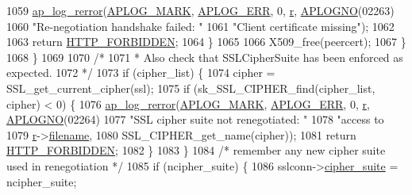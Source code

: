 \begin{DoxyCode}
{{{1059                     \hyperlink{group__APACHE__CORE__LOG_ga4c112558ccffd6b363da102b2052d2a6}{ap\_log\_rerror}(\hyperlink{group__APACHE__CORE__LOG_ga655e126996849bcb82e4e5a14c616f4a}{APLOG\_MARK}, \hyperlink{group__APACHE__CORE__LOG_ga57ad94ed8c92c4306de90479251a5d58}{APLOG\_ERR}, 0, 
      \hyperlink{group__APACHE__CORE__CONFIG_ga091cdd45984e865a888a4f8bb8fe107a}{r}, \hyperlink{group__APACHE__CORE__LOG_ga1dee8a07e06bc5b3de8b89662c2cd666}{APLOGNO}(02263)
1060                                   \textcolor{stringliteral}{"Re-negotiation handshake failed: "}
1061                                   \textcolor{stringliteral}{"Client certificate missing"});
1062 
1063                     \textcolor{keywordflow}{return} \hyperlink{group__HTTP__Status_ga92646f876056a1e5013e0050496dc04d}{HTTP\_FORBIDDEN};
1064                 \}
1065 
1066                 X509\_free(peercert);
1067             \}
1068         \}
1069 
1070         \textcolor{comment}{/*}
1071 \textcolor{comment}{         * Also check that SSLCipherSuite has been enforced as expected.}
1072 \textcolor{comment}{         */}
1073         \textcolor{keywordflow}{if} (cipher\_list) \{
1074             cipher = SSL\_get\_current\_cipher(ssl);
1075             \textcolor{keywordflow}{if} (sk\_SSL\_CIPHER\_find(cipher\_list, cipher) < 0) \{
1076                 \hyperlink{group__APACHE__CORE__LOG_ga4c112558ccffd6b363da102b2052d2a6}{ap\_log\_rerror}(\hyperlink{group__APACHE__CORE__LOG_ga655e126996849bcb82e4e5a14c616f4a}{APLOG\_MARK}, \hyperlink{group__APACHE__CORE__LOG_ga57ad94ed8c92c4306de90479251a5d58}{APLOG\_ERR}, 0, 
      \hyperlink{group__APACHE__CORE__CONFIG_ga091cdd45984e865a888a4f8bb8fe107a}{r}, \hyperlink{group__APACHE__CORE__LOG_ga1dee8a07e06bc5b3de8b89662c2cd666}{APLOGNO}(02264)
1077                              \textcolor{stringliteral}{"SSL cipher suite not renegotiated: "}
1078                              \textcolor{stringliteral}{"access to %
1079                               \hyperlink{group__APACHE__CORE__CONFIG_ga091cdd45984e865a888a4f8bb8fe107a}{r}->\hyperlink{structrequest__rec_a655cb2b33cbb40bd95c8da4d0da55eab}{filename},
1080                               SSL\_CIPHER\_get\_name(cipher));
1081                 \textcolor{keywordflow}{return} \hyperlink{group__HTTP__Status_ga92646f876056a1e5013e0050496dc04d}{HTTP\_FORBIDDEN};
1082             \}
1083         \}
1084         \textcolor{comment}{/* remember any new cipher suite used in renegotiation */}
1085         \textcolor{keywordflow}{if} (ncipher\_suite) \{
1086             sslconn->\hyperlink{structSSLConnRec_ad05c2c70b3f1febdee2a34ca0dbb79fb}{cipher\_suite} = ncipher\_suite;
}}}}
\end{DoxyCode}
